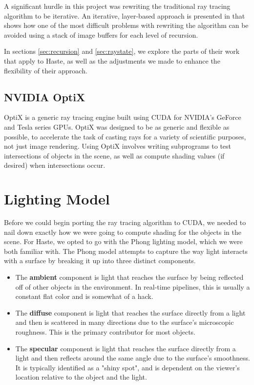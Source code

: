 \documentclass{acmsiggraph}                     %
\begin{document}
    A significant hurdle in this project was rewriting the traditional ray tracing algorithm to
    be iterative. An iterative, layer-based approach is presented in \cite{Segovia09} that shows
    how one of the most difficult problems with rewriting the algorithm can be avoided using a
    stack of image buffers for each level of recursion.

    In sections \ref{sec:recursion} and \ref{sec:raystate}, we explore the parts of their work that apply to Haste, as
    well as the adjustments we made to enhance the flexibility of their approach.

    \subsection{NVIDIA OptiX}
    \label{sec:optix}

    OptiX is a generic ray tracing engine built using CUDA for NVIDIA's GeForce and Tesla
    series GPUs. OptiX was designed to be as generic and flexible as possible, to accelerate
    the task of casting rays for a variety of scientific purposes, not just image rendering. Using
    OptiX involves writing subprograms to test intersections of objects in the scene, as well
    as compute shading values (if desired) when intersections occur. \cite{Parker10}

\section{Lighting Model}
\label{sec:lighting}

Before we could begin porting the ray tracing algorithm to CUDA, we needed to
nail down exactly how we were going to compute shading for the objects in the
scene. For Haste, we opted to go with the Phong lighting model, which we were
both familiar with. The Phong model attempts to capture the way light interacts
with a surface by breaking it up into three distinct components.

\begin{itemize}
    \item The \textbf{ambient} component is light that reaches the surface by
    being reflected off of other objects in the environment. In real-time pipelines,
    this is usually a constant flat color and is somewhat of a hack.

    \item The \textbf{diffuse} component is light that reaches the surface directly
    from a light and then is scattered in many directions due to the surface's microscopic roughness.
    This is the primary contributor for most objects.

    \item The \textbf{specular} component is light that reaches the surface directly
    from a light and then reflects around the same angle due to the surface's
    smoothness. It is typically identified as a "shiny spot", and is dependent on the
    viewer's location relative to the object and the light.
\end{itemize}
\end{document}
